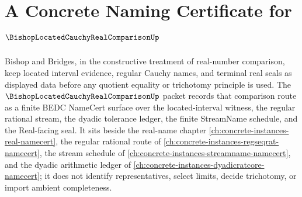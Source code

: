\chapter{A Concrete Naming Certificate for $\BishopLocatedCauchyRealComparisonUp$}
\label{ch:concrete-instances-bishop-located-cauchy-real-comparison-namecert}

Bishop and Bridges, in the constructive treatment of real-number comparison, keep located interval evidence, regular Cauchy names, and terminal real seals as displayed data before any quotient equality or trichotomy principle is used. The $\BishopLocatedCauchyRealComparisonUp$ packet records that comparison route as a finite BEDC NameCert surface over the located-interval witness, the regular rational stream, the dyadic tolerance ledger, the finite StreamName schedule, and the Real-facing seal. It sits beside the real-name chapter \autoref{ch:concrete-instances-real-namecert}, the regular rational route of \autoref{ch:concrete-instances-regseqrat-namecert}, the stream schedule of \autoref{ch:concrete-instances-streamname-namecert}, and the dyadic arithmetic ledger of \autoref{ch:concrete-instances-dyadicratcore-namecert}; it does not identify representatives, select limits, decide trichotomy, or import ambient completeness.

